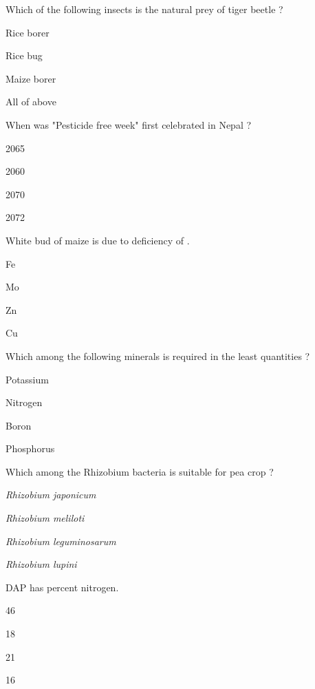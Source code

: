 \begin{questions}
\question Which of the following insects is the natural prey of tiger beetle ?
\begin{items}
\item Rice borer
\item* Rice bug
\item Maize borer
\item All of above
\end{items}

\question When was "Pesticide free week" first celebrated in Nepal ?
\begin{items}
\item 2065
\item 2060
\item* 2070
\item 2072
\end{items}

\question White bud of maize is due to deficiency of \fillin[][3cm].
\begin{items}
\item Fe
\item Mo
\item* Zn
\item Cu
\end{items}

\question Which among the following minerals is required in the least quantities ?
\begin{items}
\item Potassium
\item Nitrogen
\item* Boron
\item Phosphorus
\end{items}

\question Which among the Rhizobium bacteria is suitable for pea crop ?
\begin{items}
\item \textit{Rhizobium japonicum}
\item \textit{Rhizobium meliloti}
\item* \textit{Rhizobium leguminosarum}
\item \textit{Rhizobium lupini}
\end{items}

\question DAP has \fillin[][3cm] percent nitrogen.
\begin{items}
\item 46
\item* 18
\item 21
\item 16
\end{items}


\end{questions}
